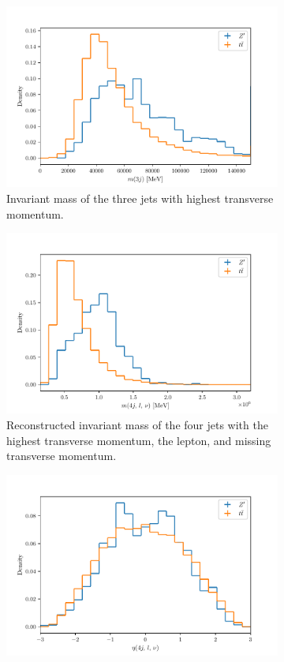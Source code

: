 \begin{figure}[H]
\begin{subfigure}{0.45\textwidth}
    \includegraphics[width=\textwidth]{python_plots/dis3.pdf}%
    \caption{Invariant mass of the three jets with highest transverse momentum.}%
    \label{fig:5e}%
  \end{subfigure}%
  \hfill
  \begin{subfigure}{0.45\textwidth}%
    \centering%
    \includegraphics[width=\textwidth]{python_plots/dis4.pdf}%
    \caption{Reconstructed invariant mass of the four jets with the highest transverse momentum, the lepton, and missing transverse momentum.}%
    \label{fig:5g}%
  \end{subfigure}%
  \hfill
  \begin{subfigure}{0.45\textwidth}%
    \centering%
    \includegraphics[width=\textwidth]{python_plots/dis5.pdf}%

\end{subfigure}
\end{figure}
